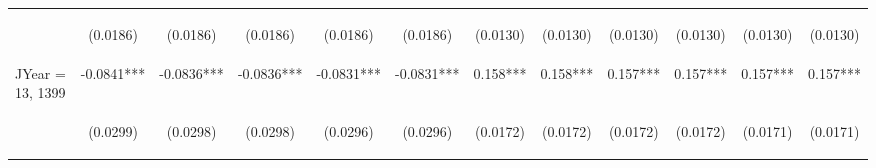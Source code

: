 \documentclass[]{article}
\begin{document}
\begin{center}
\begin{tabular}{lccccccccccc}
\vspace{4pt} & \begin{footnotesize}(0.0186)\end{footnotesize} & \begin{footnotesize}(0.0186)\end{footnotesize} & \begin{footnotesize}(0.0186)\end{footnotesize} & \begin{footnotesize}(0.0186)\end{footnotesize} & \begin{footnotesize}(0.0186)\end{footnotesize} & \begin{footnotesize}(0.0130)\end{footnotesize} & \begin{footnotesize}(0.0130)\end{footnotesize} & \begin{footnotesize}(0.0130)\end{footnotesize} & \begin{footnotesize}(0.0130)\end{footnotesize} & \begin{footnotesize}(0.0130)\end{footnotesize} & \begin{footnotesize}(0.0130)\end{footnotesize} \\
JYear = 13, 1399 & -0.0841*** & -0.0836*** & -0.0836*** & -0.0831*** & -0.0831*** & 0.158*** & 0.158*** & 0.157*** & 0.157*** & 0.157*** & 0.157*** \\
\vspace{4pt} & \begin{footnotesize}(0.0299)\end{footnotesize} & \begin{footnotesize}(0.0298)\end{footnotesize} & \begin{footnotesize}(0.0298)\end{footnotesize} & \begin{footnotesize}(0.0296)\end{footnotesize} & \begin{footnotesize}(0.0296)\end{footnotesize} & \begin{footnotesize}(0.0172)\end{footnotesize} & \begin{footnotesize}(0.0172)\end{footnotesize} & \begin{footnotesize}(0.0172)\end{footnotesize} & \begin{footnotesize}(0.0172)\end{footnotesize} & \begin{footnotesize}(0.0171)\end{footnotesize} & \begin{footnotesize}(0.0171)\end{footnotesize} \\

\end{tabular}
\end{center}
\end{document}
